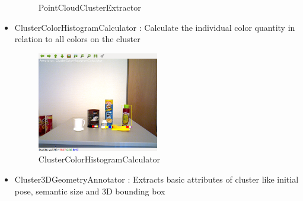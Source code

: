 \documentclass[main.tex]{subfiles}
\begin{document}
\begin{itemize}
\begin{figure}[H]
   			 \caption{PointCloudClusterExtractor}
  		\end{figure}
	\item ClusterColorHistogramCalculator : Calculate the individual color quantity in relation to all colors on the cluster   
		\begin{figure}[H]
   			 \centering
    			\includegraphics[width=0.5\textwidth]{pictures/2d/ClusterColorHistogramAnnotator.png}
   			 \caption{ClusterColorHistogramCalculator}
  		\end{figure}
	\item Cluster3DGeometryAnnotator : Extracts basic attributes of cluster like initial pose, semantic size and 3D bounding box 

\end{itemize}
\end{document}
